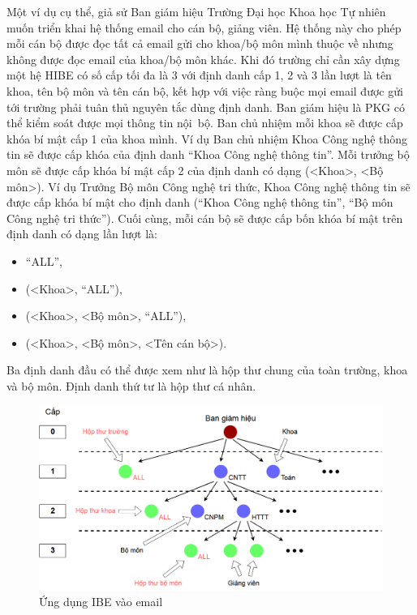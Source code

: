 \documentclass[class=report, crop=false]{standalone}
\begin{document}
			Một ví dụ cụ thể, giả sử Ban giám hiệu Trường Đại học Khoa học Tự nhiên muốn triển khai hệ thống email cho cán bộ, giảng viên. Hệ thống này cho phép mỗi cán bộ được đọc tất cả email gửi cho khoa/bộ môn mình thuộc về nhưng không được đọc email của khoa/bộ môn khác. Khi đó trường chỉ cần xây dựng một hệ HIBE có số cấp tối đa là 3 với định danh cấp 1, 2 và 3 lần lượt là tên khoa, tên bộ môn và tên cán bộ, kết hợp với việc ràng buộc mọi email được gửi tới trường phải tuân thủ nguyên tắc dùng định danh. Ban giám hiệu là PKG có thể kiểm soát được mọi thông tin nội~bộ. Ban chủ nhiệm mỗi khoa sẽ được cấp khóa bí mật cấp 1 của khoa mình. Ví dụ Ban chủ nhiệm Khoa Công nghệ thông tin sẽ được cấp khóa của định danh ``Khoa Công nghệ thông tin''. Mỗi trưởng bộ môn sẽ được cấp khóa bí mật cấp 2 của định danh có dạng (<Khoa>, <Bộ môn>). Ví dụ Trưởng Bộ môn Công nghệ tri thức, Khoa Công nghệ thông tin sẽ được cấp khóa bí mật cho định danh (``Khoa Công nghệ thông tin'', ``Bộ môn Công nghệ tri thức''). Cuối cùng, mỗi cán bộ sẽ được cấp bốn khóa bí mật trên định danh có dạng lần lượt là:
			\vspace{-\baselineskip}
			\begin{itemize}[itemindent=1cm]
				\item[] ``ALL'',
				\item[] (<Khoa>, ``ALL''),
				\item[] (<Khoa>, <Bộ môn>, ``ALL''),
				\item[] (<Khoa>, <Bộ môn>, <Tên cán bộ>).
			\end{itemize}
			\vspace{-\baselineskip}
			Ba định danh đầu có thể được xem như là hộp thư chung của toàn trường, khoa và bộ môn. Định danh thứ tư là hộp thư cá nhân.
			\begin{figure}[h] 
				\captionsetup{font=normalsize}
				\includegraphics[width=\textwidth]{application_email.png}
				\centering
				\caption{Ứng dụng IBE vào email}
			\end{figure}
\end{document}
